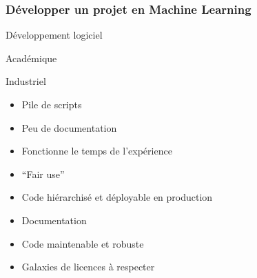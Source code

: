 \begin{frame}
  \frametitle{Développer un projet en Machine Learning}
  \begin{center}
    Développement logiciel
  \end{center}
  \begin{minipage}[c]{0.49\linewidth}
    \begin{center}
      Académique
      \newline
    \end{center}
  \end{minipage}\hfill
  \begin{minipage}[c]{0.49\linewidth}
    \begin{center}
      Industriel
      \newline
    \end{center}
  \end{minipage}\hfill
  \begin{minipage}[c]{0.49\linewidth}
    \begin{itemize}
    \item Pile de scripts
    \item Peu de documentation
    \item Fonctionne le temps de l'expérience
      \item ``Fair use''
    \end{itemize}
  \end{minipage}\hfill
  \vrule{}
  \begin{minipage}[c]{0.49\linewidth}
    \begin{itemize}
    \item Code hiérarchisé et déployable en production
    \item Documentation
    \item Code maintenable et robuste
    \item Galaxies de licences à respecter
    \end{itemize}
  \end{minipage}\hfill
\end{frame}

